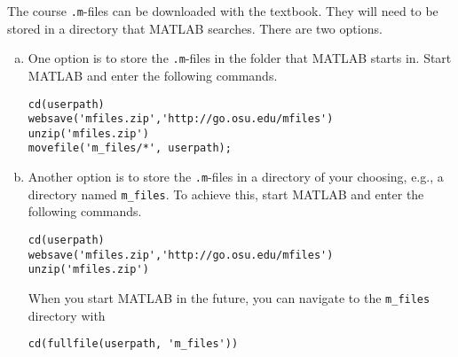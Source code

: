 \documentclass{article}
\begin{document}
The course \texttt{.m}-files can be downloaded with the textbook.
They will need to be stored in a directory that MATLAB searches.
There are two options.

\begin{enumerate}[(a)]
\item One option is to store the \texttt{.m}-files in the folder that MATLAB
  starts in.  Start MATLAB and enter the following commands.
  
\begin{verbatim}
cd(userpath)
websave('mfiles.zip','http://go.osu.edu/mfiles')
unzip('mfiles.zip')
movefile('m_files/*', userpath);
\end{verbatim}
  
\item Another option is to store the \texttt{.m}-files in a directory of your choosing, e.g., a directory named \verb|m_files|.  To achieve this, start MATLAB and enter the following commands.
\begin{verbatim}
cd(userpath)
websave('mfiles.zip','http://go.osu.edu/mfiles')
unzip('mfiles.zip')
\end{verbatim}
When you start MATLAB in the future, you can navigate to the \verb|m_files| directory with 
\begin{verbatim}
cd(fullfile(userpath, 'm_files'))
\end{verbatim}

\end{enumerate}
\end{document}
